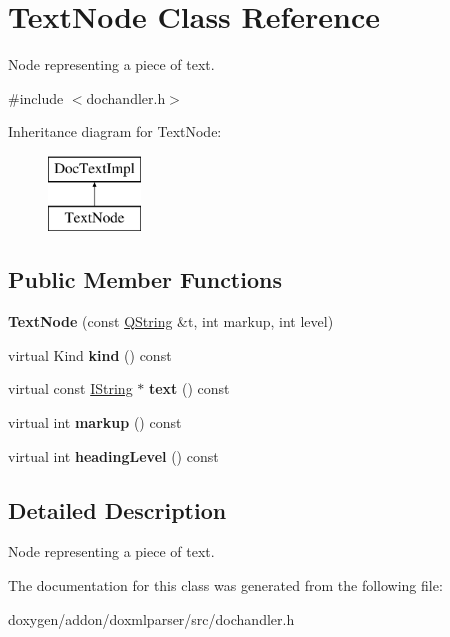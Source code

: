 \hypertarget{class_text_node}{}\section{Text\+Node Class Reference}
\label{class_text_node}


Node representing a piece of text.  




{\ttfamily \#include $<$dochandler.\+h$>$}

Inheritance diagram for Text\+Node\+:\begin{figure}[H]
\begin{center}
\leavevmode
\includegraphics[height=2.000000cm]{class_text_node}
\end{center}
\end{figure}
\subsection*{Public Member Functions}
\begin{DoxyCompactItemize}
\item 
\mbox{\label{class_text_node_ab1a635984f5b460827c346ce7742a0b4}} 
{\bfseries Text\+Node} (const \mbox{\hyperlink{class_q_string}{Q\+String}} \&t, int markup, int level)
\item 
\mbox{\label{class_text_node_a9c218b89c85ac0caabb1169a7f947ec7}} 
virtual Kind {\bfseries kind} () const
\item 
\mbox{\label{class_text_node_ad5fcca083f61b9defed936fbd724fd6f}} 
virtual const \mbox{\hyperlink{class_i_string}{I\+String}} $\ast$ {\bfseries text} () const
\item 
\mbox{\label{class_text_node_a68ad140dfeed4b1005b5bcb569c1f64c}} 
virtual int {\bfseries markup} () const
\item 
\mbox{\label{class_text_node_a4a24fedea70690f176ff499d03336618}} 
virtual int {\bfseries heading\+Level} () const
\end{DoxyCompactItemize}


\subsection{Detailed Description}
Node representing a piece of text. 



The documentation for this class was generated from the following file\+:\begin{DoxyCompactItemize}
\item 
doxygen/addon/doxmlparser/src/dochandler.\+h\end{DoxyCompactItemize}
